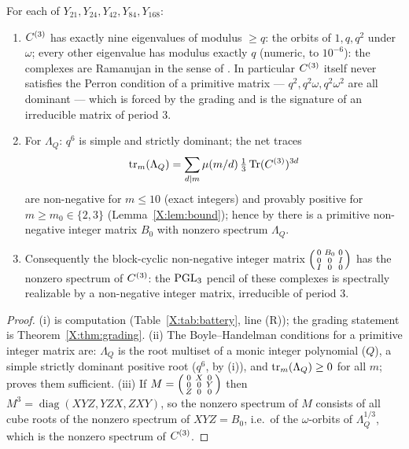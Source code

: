 \begin{theorem}\label{X:thm:realizable}
For each of $Y_{21},Y_{24},Y_{42},Y_{84},Y_{168}$:
\begin{enumerate}
\item[(i)] $C^{(3)}$ has exactly nine eigenvalues of modulus $\ge q$: the orbits of $1,q,q^{2}$
under $\omega$; every other eigenvalue has modulus exactly $q$ (numeric, to $10^{-6}$): the
complexes are Ramanujan in the sense of \cite{KL}. In particular $C^{(3)}$ itself never
satisfies the Perron condition of a primitive matrix --- $q^{2},q^{2}\omega,q^{2}\omega^{2}$
are all dominant --- which is forced by the grading and is the signature of an irreducible
matrix of period $3$.
\item[(ii)] For $\Lambda_Q$: $q^{6}$ is simple and strictly dominant; the net traces
\[
\operatorname{tr}_m(\Lambda_Q)=\sum_{d\mid m}\mu(m/d)\,\tfrac13\operatorname{Tr}(C^{(3)})^{3d}
\]
are non-negative for $m\le10$ (exact integers) and provably positive for
$m\ge m_0\in\{2,3\}$ (Lemma~\ref{X:lem:bound}); hence by \cite{KOR} there is a primitive
non-negative integer matrix $B_0$ with nonzero spectrum $\Lambda_Q$.
\item[(iii)] Consequently the block-cyclic non-negative integer matrix
$\begin{psmallmatrix}0&B_0&0\\0&0&I\\I&0&0\end{psmallmatrix}$ has the nonzero spectrum of
$C^{(3)}$: the $\mathrm{PGL}_3$ pencil of these complexes is spectrally realizable by a non-negative
integer matrix, irreducible of period $3$.
\end{enumerate}
\end{theorem}

\begin{proof}
(i) is computation (Table~\ref{X:tab:battery}, line (R)); the grading statement is
Theorem~\ref{X:thm:grading}. (ii) The Boyle--Handelman conditions for a primitive integer
matrix are: $\Lambda_Q$ is the root multiset of a monic integer polynomial ($Q$), a simple
strictly dominant positive root ($q^{6}$, by (i)), and $\operatorname{tr}_m(\Lambda_Q)\ge0$ for all $m$;
\cite{KOR} proves them sufficient. (iii) If $M=\begin{psmallmatrix}0&X&0\\0&0&Y\\Z&0&0
\end{psmallmatrix}$ then $M^{3}=\operatorname{diag}(XYZ,YZX,ZXY)$, so the nonzero spectrum
of $M$ consists of all cube roots of the nonzero spectrum of $XYZ=B_0$, i.e.\ of the
$\omega$-orbits of $\Lambda_Q^{1/3}$, which is the nonzero spectrum of $C^{(3)}$.
\end{proof}


